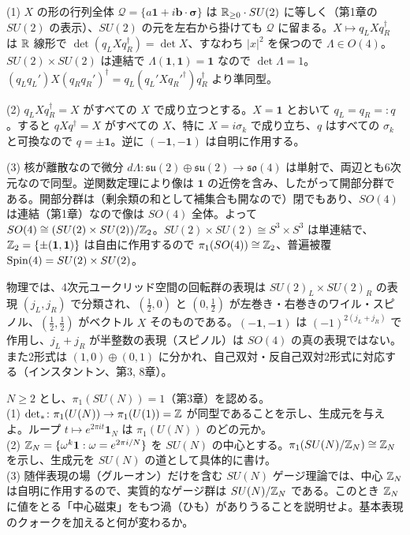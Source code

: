 \begin{solution}
(1) $X$ の形の行列全体 $\mathcal Q=\{a\mathbf 1+i\bm b\cdot\bm\sigma\}$ は $\mathbb{R}_{\ge0}\cdot SU(2)$ に等しく（第1章の $SU(2)$ の表示）、$SU(2)$ の元を左右から掛けても $\mathcal Q$ に留まる。$X\mapsto q_LXq_R^\dagger$ は $\mathbb{R}$ 線形で $\det(q_LXq_R^\dagger)=\det X$、すなわち $\lvert x\rvert^2$ を保つので $\Lambda\in O(4)$。$SU(2)\times SU(2)$ は連結で $\Lambda(\mathbf 1,\mathbf 1)=\mathbf 1$ なので $\det\Lambda=1$。$(q_Lq_L')X(q_Rq_R')^\dagger=q_L(q_L'Xq_R'^\dagger)q_R^\dagger$ より準同型。

(2) $q_LXq_R^\dagger=X$ がすべての $X$ で成り立つとする。$X=\mathbf 1$ とおいて $q_L=q_R=:q$。すると $qXq^\dagger=X$ がすべての $X$、特に $X=i\sigma_k$ で成り立ち、$q$ はすべての $\sigma_k$ と可換なので $q=\pm\mathbf 1$。逆に $(-\mathbf 1,-\mathbf 1)$ は自明に作用する。

(3) 核が離散なので微分 $d\Lambda\colon\mathfrak{su}(2)\oplus\mathfrak{su}(2)\to\mathfrak{so}(4)$ は単射で、両辺とも6次元なので同型。逆関数定理により像は $\mathbf 1$ の近傍を含み、したがって開部分群である。開部分群は（剰余類の和として補集合も開なので）閉でもあり、$SO(4)$ は連結（第1章）なので像は $SO(4)$ 全体。よって $SO(4)\cong(SU(2)\times SU(2))/\mathbb{Z}_2$。$SU(2)\times SU(2)\cong S^3\times S^3$ は単連結で、$\mathbb{Z}_2=\{\pm(\mathbf 1,\mathbf 1)\}$ は自由に作用するので $\pi_1(SO(4))\cong\mathbb{Z}_2$、普遍被覆 $\operatorname{Spin}(4)=SU(2)\times SU(2)$。

物理では、4次元ユークリッド空間の回転群の表現は $SU(2)_L\times SU(2)_R$ の表現 $(j_L,j_R)$ で分類され、$(\tfrac12,0)$ と $(0,\tfrac12)$ が左巻き・右巻きのワイル・スピノル、$(\tfrac12,\tfrac12)$ がベクトル $X$ そのものである。$(-\mathbf 1,-\mathbf 1)$ は $(-1)^{2(j_L+j_R)}$ で作用し、$j_L+j_R$ が半整数の表現（スピノル）は $SO(4)$ の真の表現ではない。また2形式は $(1,0)\oplus(0,1)$ に分かれ、自己双対・反自己双対2形式に対応する（インスタントン、第3, 8章）。
\end{solution}

\begin{problem}[難易度 B]\label{ch02-prob-un}
$N\ge2$ とし、$\pi_1(SU(N))=1$（第3章）を認める。\\
(1) $\det_*\colon\pi_1(U(N))\to\pi_1(U(1))=\mathbb{Z}$ が同型であることを示し、生成元を与えよ。ループ $t\mapsto e^{2\pi it}\mathbf 1_N$ は $\pi_1(U(N))$ のどの元か。\\
(2) $\mathbb{Z}_N=\{\omega^k\mathbf 1:\omega=e^{2\pi i/N}\}$ を $SU(N)$ の中心とする。$\pi_1(SU(N)/\mathbb{Z}_N)\cong\mathbb{Z}_N$ を示し、生成元を $SU(N)$ の道として具体的に書け。\\
(3) 随伴表現の場（グルーオン）だけを含む $SU(N)$ ゲージ理論では、中心 $\mathbb{Z}_N$ は自明に作用するので、実質的なゲージ群は $SU(N)/\mathbb{Z}_N$ である。このとき $\mathbb{Z}_N$ に値をとる「中心磁束」をもつ渦（ひも）がありうることを説明せよ。基本表現のクォークを加えると何が変わるか。
\end{problem}

